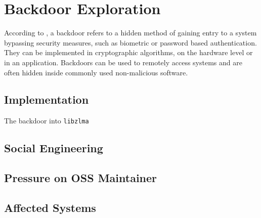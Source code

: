 \section{Backdoor Exploration}

According to \cite{wysopal2007static}, a backdoor refers to a hidden method of
gaining entry to a system bypassing security measures, such as biometric or
password based authentication. They can be implemented in cryptographic
algorithms, on the hardware level or in an application. Backdoors can be used
to remotely access systems and are often hidden inside commonly used
non-malicious software.

\subsection{Implementation}

The backdoor into \texttt{libzlma} 

\subsection{Social Engineering}
\subsection{Pressure on OSS Maintainer}
\subsection{Affected Systems}
